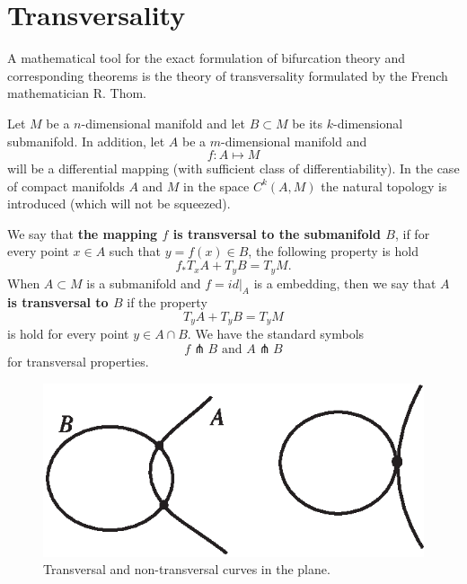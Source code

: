 \section{Transversality}

A mathematical tool for the exact formulation of bifurcation theory and corresponding theorems is the theory of transversality formulated by the French mathematician R. Thom.

Let $M$ be a $n$-dimensional manifold and let $B\subset M$ be its $k$-dimensional submanifold. In addition, let $A$ be a $m$-dimensional manifold and 
$$
f:A\longmapsto M
$$
will be a differential mapping (with sufficient class of differentiability). In the case of compact manifolds $A$ and $M$ in the space $C^{k}(A,M)$ the natural topology is introduced (which will not be squeezed).
 
 \begin{definition}
 	We say that \textbf{the mapping $f$ is transversal to the submanifold $B$}, if for every point $x\in A$ such that $y = f (x) \in B$, the following property is hold
 	$$
 	f_{\ast }T_{x}A+T_{y}B=T_{y}M.
 	$$
 	When $A\subset M$ is a submanifold and $f=id|_{A}$ is a embedding, then we say that \textbf{$A$ is transversal to $B$} if the property
 	$$
 	T_{y}A+T_{y}B=T_{y}M
 	$$
 	is hold for every point $y\in A\cap B$. We have the standard symbols
 	$$
 	f\pitchfork B\text{ \ \ and \ \ }A\pitchfork B
 	$$
 	for transversal properties.
 \end{definition}

\begin{figure}[!ht]
	\centering
	\includegraphics [scale=1]{jtr36}
	\caption{Transversal and non-transversal curves in the plane.}
	\label{fig:3.6}
\end{figure}

